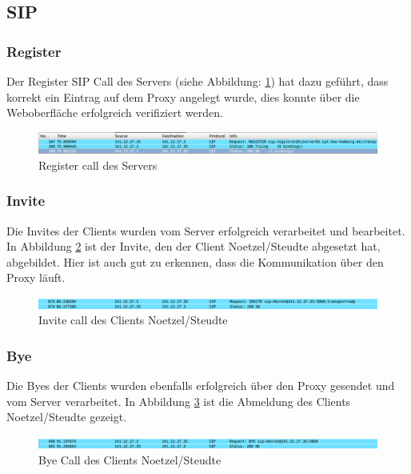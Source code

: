 \documentclass[10pt]{scrartcl}
\begin{document}
\subsection{SIP}
	\subsubsection{Register} 
	Der Register SIP Call des Servers (siehe Abbildung: \ref{img:registerServer}) hat dazu geführt, dass korrekt ein Eintrag auf dem Proxy angelegt wurde, dies konnte über die Weboberfläche erfolgreich verifiziert werden.
	
	\begin{figure}[htb]
        \centering
         \includegraphics[width=\textwidth]{img/register}
         \caption{Register call des Servers}
        \label{img:registerServer}
	\end{figure}	
	
	\subsubsection{Invite}
	Die Invites der Clients wurden vom Server erfolgreich verarbeitet und bearbeitet. In Abbildung \ref{img:invites} ist der Invite, den der Client Noetzel/Steudte abgesetzt hat, abgebildet. Hier ist auch gut zu erkennen, dass die Kommunikation über den Proxy läuft.

	\begin{figure}[htb]
        \centering
         \includegraphics[width=\textwidth]{img/invite}
         \caption{Invite call des Clients Noetzel/Steudte}
        \label{img:invites}
	\end{figure}		

	\subsubsection{Bye}
	Die Byes  der Clients wurden ebenfalls erfolgreich über den Proxy gesendet und vom Server verarbeitet. In Abbildung \ref{img:byes} ist die Abmeldung des Clients Noetzel/Steudte gezeigt.
	
	\begin{figure}[htb]
        \centering
         \includegraphics[width=\textwidth]{img/bye}
         \caption{Bye Call des Clients Noetzel/Steudte}
        \label{img:byes}
	\end{figure}		
	
\end{document}
